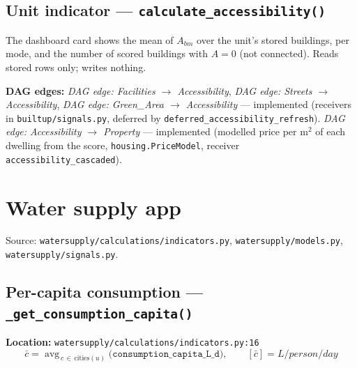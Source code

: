 \documentclass[11pt]{article}
\newcommand{\code}[1]{\texttt{#1}}
\newcommand{\dagedge}[1]{\textit{DAG edge: #1}}
\newcommand{\statusdone}{\textcolor{green!50!black}{implemented}}
\begin{document}
\subsection{Unit indicator --- \code{calculate\_accessibility()}}
The dashboard card shows the mean of $A_{bm}$ over the unit's stored buildings, per mode, and the number of scored buildings with $A = 0$ (not connected). Reads stored rows only; writes nothing.

\textbf{DAG edges:} \dagedge{Facilities $\rightarrow$ Accessibility}, \dagedge{Streets $\rightarrow$ Accessibility}, \dagedge{Green\_Area $\rightarrow$ Accessibility} --- \statusdone{} (receivers in \code{builtup/signals.py}, deferred by \code{deferred\_accessibility\_refresh}). \dagedge{Accessibility $\rightarrow$ Property} --- \statusdone{} (modelled price per m$^2$ of each dwelling from the score, \code{housing.PriceModel}, receiver \code{accessibility\_cascaded}).

\section{Water supply app}
\label{sec:watersupply}

Source: \code{watersupply/calculations/indicators.py}, \code{watersupply/models.py}, \code{watersupply/signals.py}.

\subsection{Per-capita consumption --- \code{\_get\_consumption\_capita()}}
\textbf{Location:} \code{watersupply/calculations/indicators.py:16}
\begin{equation}
  \bar{c} = \operatorname{avg}_{\,c\, \in\, \text{cities}(u)}\big(\texttt{consumption\_capita\_L\_d}\big), \qquad [\bar{c}] = \si{L/person/day}
\end{equation}
\end{document}
